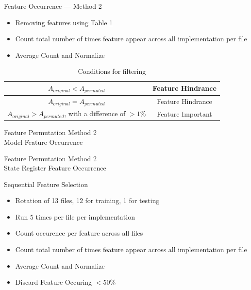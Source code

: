 \documentclass[aspectratio=169]{beamer}
\begin{document}
\begin{frame}{Feature Occurrence --- Method 2}
\begin{itemize}
	\item Removing features using Table \ref{tab: conditions for filtering}
	\item Count total number of times feature appear across all implementation per file
	\item Average Count and Normalize
\end{itemize}
\begin{table}[ht]
	\centering
   \begin{tabular}{|c|c|}
   	\hline
       $A_{original}<A_{permuted}$ & Feature Hindrance\\
       \hline
       $A_{original}=A_{permuted}$ & Feature Hindrance\\
       \hline
       $A_{original}>A_{permuted}$, \; with a difference of $> 1\%$  & Feature Important\\
       \hline
  \end{tabular}
  \caption{Conditions for filtering}
  \label{tab: conditions for filtering}
\end{table}
\end{frame}

\begin{frame}{Feature Permutation Method 2 \\Model Feature Occurrence}
\centering
\resizebox{!}{0.7\paperheight}{
	
	\label{fig:Feature Occurrence Percentage: FP Model}
}
\end{frame}

\begin{frame}{Feature Permutation Method 2 \\State Register Feature Occurrence}
\centering
\resizebox{!}{0.7\paperheight}{

\label{fig:Feature Occurrence Percentage: FP State Register}
}
\end{frame}

\begin{frame}{Sequential Feature Selection}
\begin{itemize}
	\item Rotation of 13 files, 12 for training, 1 for testing
	\item Run 5 times per file per implementation
	\item Count occurence per feature across all files
	\item Count total number of times feature appear across all implementation per file
	\item Average Count and Normalize
	\item Discard Feature Occuring $<50\%$
\end{itemize}
\end{frame}
\end{document}
